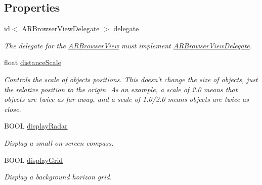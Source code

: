 \subsection*{Properties}
\begin{DoxyCompactItemize}
\item 
\hypertarget{interface_a_r_browser_view_ac71040f5d7529f5d1585f774524e6e48}{
id$<$ \hyperlink{protocol_a_r_browser_view_delegate-p}{ARBrowserViewDelegate} $>$ \hyperlink{interface_a_r_browser_view_ac71040f5d7529f5d1585f774524e6e48}{delegate}}
\label{interface_a_r_browser_view_ac71040f5d7529f5d1585f774524e6e48}

\begin{DoxyCompactList}\small\item\em The delegate for the \hyperlink{interface_a_r_browser_view}{ARBrowserView} must implement \hyperlink{protocol_a_r_browser_view_delegate-p}{ARBrowserViewDelegate}. \end{DoxyCompactList}\item 
\hypertarget{interface_a_r_browser_view_a91aef66437e470e8f51b90f5f2ec613c}{
float \hyperlink{interface_a_r_browser_view_a91aef66437e470e8f51b90f5f2ec613c}{distanceScale}}
\label{interface_a_r_browser_view_a91aef66437e470e8f51b90f5f2ec613c}

\begin{DoxyCompactList}\small\item\em Controls the scale of objects positions. This doesn't change the size of objects, just the relative position to the origin. As an example, a scale of 2.0 means that objects are twice as far away, and a scale of 1.0/2.0 means objects are twice as close. \end{DoxyCompactList}\item 
\hypertarget{interface_a_r_browser_view_a541177be5371872bc4153d8eb8805ff2}{
BOOL \hyperlink{interface_a_r_browser_view_a541177be5371872bc4153d8eb8805ff2}{displayRadar}}
\label{interface_a_r_browser_view_a541177be5371872bc4153d8eb8805ff2}

\begin{DoxyCompactList}\small\item\em Display a small on-\/screen compass. \end{DoxyCompactList}\item 
\hypertarget{interface_a_r_browser_view_a767b94294f4358686e88d043198b9881}{
BOOL \hyperlink{interface_a_r_browser_view_a767b94294f4358686e88d043198b9881}{displayGrid}}
\label{interface_a_r_browser_view_a767b94294f4358686e88d043198b9881}

\begin{DoxyCompactList}\small\item\em Display a background horizon grid. \end{DoxyCompactList}\end{DoxyCompactItemize}



